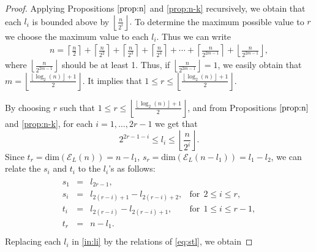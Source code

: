 \documentclass[preprint]{elsarticle}
\begin{document}
\begin{proof}
Applying Propositions $\ref{prop:n}$ and \ref{prop:n-k} recursively, we obtain that each $l_{i} $ is bounded above by $\left\lfloor \frac{n}{2^{i}} \right\rfloor.$ 
To determine the maximum possible value to $r$ we choose the maximum value to each $l_{i}.$ Thus we can write
\begin{align*}
    n=\left\lceil \frac{n}{2} \right\rceil + \left\lceil \frac{n}{2^2} \right\rceil + \left\lceil \frac{n}{2^3} \right\rceil + \left\lceil \frac{n}{2^4} \right\rceil + \cdots + \left\lceil \frac{n}{2^{2m-1}} \right\rceil + \left\lfloor \frac{n}{2^{2m-1}} \right\rfloor,
\end{align*}
where $\left\lfloor \frac{n}{2^{2m-1}} \right\rfloor$ should be at least 1.  Thus, if $\left\lfloor \frac{n}{2^{2m-1}} \right\rfloor = 1$, we easily obtain that $m=\left\lfloor \frac{\left\lfloor \log_2(n)  \right\rfloor + 1}{2} \right\rfloor$. It implies that $1\leq r \leq \left\lfloor \frac{\left\lfloor \log_2(n)  \right\rfloor + 1}{2} \right\rfloor.$

By choosing $r$ such that $1\leq r \leq \left\lfloor \frac{\left\lfloor \log_2(n)  \right\rfloor + 1}{2} \right\rfloor$, and from  Propositions $\ref{prop:n}$ and \ref{prop:n-k}, for each $i=1,\ldots,2r-1$ we get that 
\begin{equation}\label{in:li}
    2^{2r-1-i} \leq l_{i} \leq \left\lfloor \frac{n}{2^{i}} \right\rfloor. 
\end{equation}
Since $t_r = \mathrm{dim}(\mathcal{E}_{L}(n)) = n - l_1 $, $s_r = \mathrm{dim}(\mathcal{E}_{L}(n-l_1)) = l_1-l_2$, we can relate the $s_i$ and $t_i$ to the $l_i$'s as follows:
\begin{align}\label{eq:stl}
    \begin{array}{llll}
     s_1 & = & l_{2r-1},  \\
     s_i & = & l_{2(r-i)+1} - l_{2(r-i)+2}, & \text{for} \ \ 2\leq i \leq r,\\
     t_i & = & l_{2(r-i)} - l_{2(r-i)+1}, & \text{for} \ \ 1\leq i \leq r-1,\\
     t_r & = & n - l_{1}.  \\
\end{array}
\end{align}
Replacing each $l_i$ in \eqref{in:li} by the relations of \eqref{eq:stl}, we obtain


\end{proof}
\end{document}
